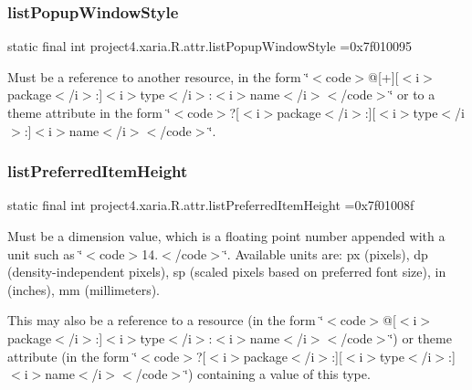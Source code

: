 \subsubsection{\texorpdfstring{list\+Popup\+Window\+Style}{listPopupWindowStyle}}
{\footnotesize\ttfamily static final int project4.\+xaria.\+R.\+attr.\+list\+Popup\+Window\+Style =0x7f010095\hspace{0.3cm}{\ttfamily [static]}}

Must be a reference to another resource, in the form \char`\"{}$<$code$>$@\mbox{[}+\mbox{]}\mbox{[}$<$i$>$package$<$/i$>$\+:\mbox{]}$<$i$>$type$<$/i$>$\+:$<$i$>$name$<$/i$>$$<$/code$>$\char`\"{} or to a theme attribute in the form \char`\"{}$<$code$>$?\mbox{[}$<$i$>$package$<$/i$>$\+:\mbox{]}\mbox{[}$<$i$>$type$<$/i$>$\+:\mbox{]}$<$i$>$name$<$/i$>$$<$/code$>$\char`\"{}. \mbox{\label{classproject4_1_1xaria_1_1R_1_1attr_aff9b727d05ae5a7e4979a7d9b32cbce0}} 
\subsubsection{\texorpdfstring{list\+Preferred\+Item\+Height}{listPreferredItemHeight}}
{\footnotesize\ttfamily static final int project4.\+xaria.\+R.\+attr.\+list\+Preferred\+Item\+Height =0x7f01008f\hspace{0.3cm}{\ttfamily [static]}}

Must be a dimension value, which is a floating point number appended with a unit such as \char`\"{}$<$code$>$14.\+5sp$<$/code$>$\char`\"{}. Available units are\+: px (pixels), dp (density-\/independent pixels), sp (scaled pixels based on preferred font size), in (inches), mm (millimeters). 

This may also be a reference to a resource (in the form \char`\"{}$<$code$>$@\mbox{[}$<$i$>$package$<$/i$>$\+:\mbox{]}$<$i$>$type$<$/i$>$\+:$<$i$>$name$<$/i$>$$<$/code$>$\char`\"{}) or theme attribute (in the form \char`\"{}$<$code$>$?\mbox{[}$<$i$>$package$<$/i$>$\+:\mbox{]}\mbox{[}$<$i$>$type$<$/i$>$\+:\mbox{]}$<$i$>$name$<$/i$>$$<$/code$>$\char`\"{}) containing a value of this type. \mbox{\label{classproject4_1_1xaria_1_1R_1_1attr_a3cfdfb0977753f1d35ce98252e735095}} 
